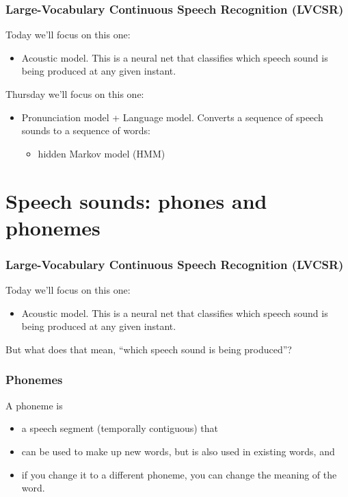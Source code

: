\documentclass{beamer}
\begin{document}
\begin{frame}
  \frametitle{Large-Vocabulary Continuous Speech Recognition (LVCSR)}

  Today we'll focus on this one:
  \begin{itemize}
  \item Acoustic model.  This is a neural net that classifies which
    speech sound is being produced at any given instant.
  \end{itemize}
  Thursday  we'll focus on this one:
  \begin{itemize}
  \item Pronunciation model + Language model. Converts a sequence of
    speech sounds to a sequence of words:
    \begin{itemize}
    \item hidden Markov model (HMM)
    \end{itemize}
  \end{itemize}
\end{frame}

\section[Phonemes]{Speech sounds: phones and phonemes}
\setcounter{subsection}{1}

\begin{frame}
  \frametitle{Large-Vocabulary Continuous Speech Recognition (LVCSR)}

  Today we'll focus on this one:
  \begin{itemize}
  \item Acoustic model.  This is a neural net that classifies which
    speech sound is being produced at any given instant.
  \end{itemize}
  But what does that mean, ``which speech sound is being produced''?  
\end{frame}

\begin{frame}
  \frametitle{Phonemes}

  A phoneme is
  \begin{itemize}
  \item a speech segment (temporally contiguous) that
  \item can be used to make up new words, but is also used in existing words, and
  \item if you change it to a different phoneme, you can change the
    meaning of the word.
  \end{itemize}
\end{frame}
\end{document}
